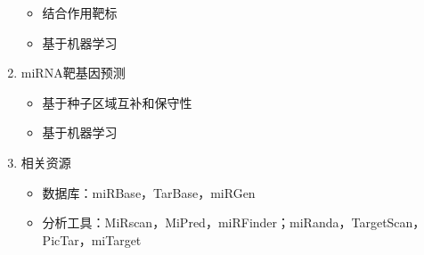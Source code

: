 \documentclass{TIJMUjiaoanLL}
\begin{document}
\begin{enumerate}
\begin{itemize}
      \item 结合作用靶标
      \item 基于机器学习
    \end{itemize}
  \item miRNA靶基因预测
    \begin{itemize}
      \item 基于种子区域互补和保守性
      \item 基于机器学习
    \end{itemize}
  \item 相关资源
    \begin{itemize}
      \item 数据库：miRBase，TarBase，miRGen
      \item 分析工具：MiRscan，MiPred，miRFinder；miRanda，TargetScan，PicTar，miTarget
    \end{itemize}
\end{enumerate}
\end{document}
